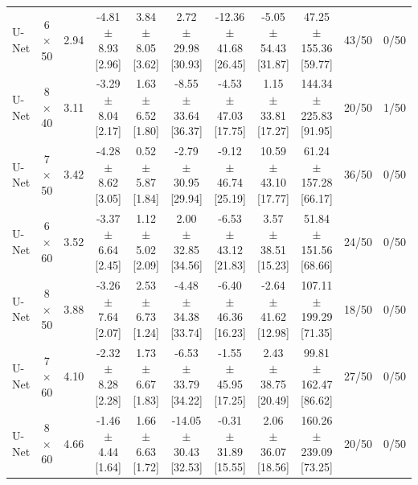 \begin{tabular}{lcccccccccc}
U-Net & 6 $\times$ 50 & 2.94 & -4.81 $\pm$ 8.93 [2.96] & 3.84 $\pm$ 8.05 [3.62] & 2.72 $\pm$ 29.98 [30.93] & -12.36 $\pm$ 41.68 [26.45] & -5.05 $\pm$ 54.43 [31.87] & 47.25 $\pm$ 155.36 [59.77] & 43/50 & 0/50 \\
U-Net & 8 $\times$ 40 & 3.11 & -3.29 $\pm$ 8.04 [2.17] & 1.63 $\pm$ 6.52 [1.80] & -8.55 $\pm$ 33.64 [36.37] & -4.53 $\pm$ 47.03 [17.75] & 1.15 $\pm$ 33.81 [17.27] & 144.34 $\pm$ 225.83 [91.95] & 20/50 & 1/50 \\
U-Net & 7 $\times$ 50 & 3.42 & -4.28 $\pm$ 8.62 [3.05] & 0.52 $\pm$ 5.87 [1.84] & -2.79 $\pm$ 30.95 [29.94] & -9.12 $\pm$ 46.74 [25.19] & 10.59 $\pm$ 43.10 [17.77] & 61.24 $\pm$ 157.28 [66.17] & 36/50 & 0/50 \\
U-Net & 6 $\times$ 60 & 3.52 & -3.37 $\pm$ 6.64 [2.45] & 1.12 $\pm$ 5.02 [2.09] & 2.00 $\pm$ 32.85 [34.56] & -6.53 $\pm$ 43.12 [21.83] & 3.57 $\pm$ 38.51 [15.23] & 51.84 $\pm$ 151.56 [68.66] & 24/50 & 0/50 \\
U-Net & 8 $\times$ 50 & 3.88 & -3.26 $\pm$ 7.64 [2.07] & 2.53 $\pm$ 6.73 [1.24] & -4.48 $\pm$ 34.38 [33.74] & -6.40 $\pm$ 46.36 [16.23] & -2.64 $\pm$ 41.62 [12.98] & 107.11 $\pm$ 199.29 [71.35] & 18/50 & 0/50 \\
U-Net & 7 $\times$ 60 & 4.10 & -2.32 $\pm$ 8.28 [2.28] & 1.73 $\pm$ 6.67 [1.83] & -6.53 $\pm$ 33.79 [34.22] & -1.55 $\pm$ 45.95 [17.25] & 2.43 $\pm$ 38.75 [20.49] & 99.81 $\pm$ 162.47 [86.62] & 27/50 & 0/50 \\
U-Net & 8 $\times$ 60 & 4.66 & -1.46 $\pm$ 4.44 [1.64] & 1.66 $\pm$ 6.63 [1.72] & -14.05 $\pm$ 30.43 [32.53] & -0.31 $\pm$ 31.89 [15.55] & 2.06 $\pm$ 36.07 [18.56] & 160.26 $\pm$ 239.09 [73.25] & 20/50 & 0/50 \\
\hline
\end{tabular}
